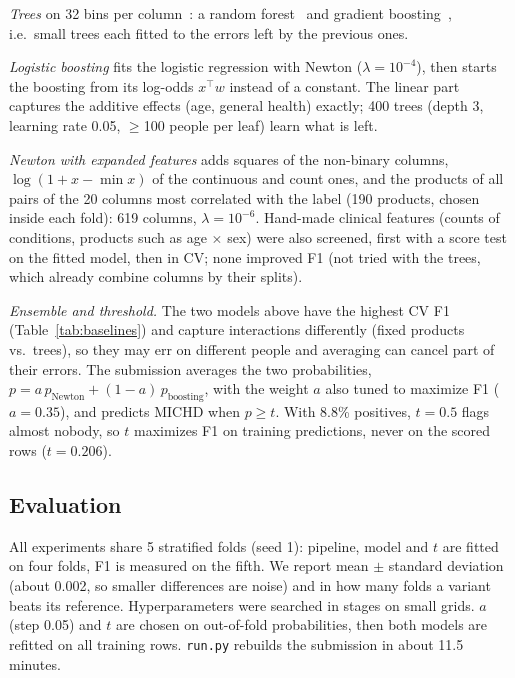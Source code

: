 \documentclass[10pt,conference,compsocconf]{IEEEtran}
\begin{document}
\emph{Trees} on 32 bins per column~\cite{ke2017lightgbm}: a random
forest~\cite{breiman2001} and gradient
boosting~\cite{friedman2001,chen2016xgboost,friedman2002}, i.e.\ small trees each
fitted to the errors left by the previous ones.

\emph{Logistic boosting} fits the logistic regression with Newton
($\lambda = 10^{-4}$), then starts the boosting from its log-odds $x^\top w$ instead of
a constant. The linear part captures the additive effects (age, general health)
exactly; 400 trees (depth 3, learning rate 0.05, $\geq$100 people per leaf) learn what
is left.

\emph{Newton with expanded features} adds squares of the non-binary columns,
$\log(1 + x - \min x)$ of the continuous and count ones, and the products of all pairs of the 20
columns most correlated with the label (190 products, chosen inside each fold):
619 columns, $\lambda = 10^{-6}$. Hand-made clinical features (counts of conditions,
products such as age $\times$ sex) were also screened, first with a score test on the
fitted model, then in CV; none improved F1 (not tried with the trees, which already
combine columns by their splits).

\emph{Ensemble and threshold.} The two models above have the highest CV F1
(Table~\ref{tab:baselines}) and capture interactions differently (fixed products
vs.\ trees), so they may err on different people and averaging can cancel part of
their errors. The submission averages the two probabilities,
$p = a\,p_{\text{Newton}} + (1 - a)\,p_{\text{boosting}}$, with the weight $a$ also
tuned to maximize F1 ($a = 0.35$), and
predicts MICHD when $p \geq t$. With 8.8\% positives, $t = 0.5$ flags almost
nobody, so $t$ maximizes F1 on training predictions, never on the scored rows
($t = 0.206$).

\subsection{Evaluation}
\label{sec:evaluation}

All experiments share 5 stratified folds (seed 1): pipeline, model and $t$ are fitted
on four folds, F1 is measured on the fifth. We report mean $\pm$ standard deviation
(about 0.002, so smaller differences are noise) and in how many folds a variant beats
its reference. Hyperparameters were searched in stages on small grids. $a$ (step 0.05)
and $t$ are chosen on out-of-fold probabilities, then both models are refitted on all
training rows. \texttt{run.py} rebuilds the submission in about 11.5 minutes.
\end{document}

